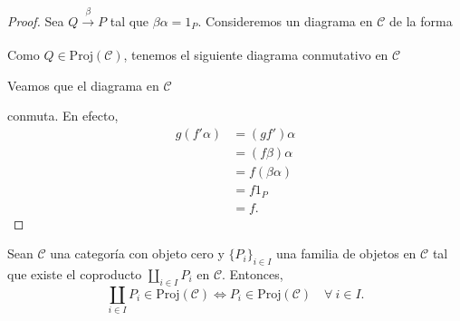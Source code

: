 \documentclass[tesis]{subfiles}
\begin{document}
\begin{proof}

    Sea $Q\xrightarrow[]{\beta} P$ tal que $\beta\alpha=1_P$. Consideremos un diagrama en $\mathscr{C}$ de la forma
    \begin{center}
    \end{center}
    Como $Q\in\text{Proj}(\mathscr{C})$, tenemos el siguiente diagrama conmutativo en $\mathscr{C}$
    \begin{center}
    \end{center}
    Veamos que el diagrama en $\mathscr{C}$
    \begin{center}
    \end{center}
    conmuta. En efecto,
    \begin{align*}
        g(f'\alpha) &= (gf')\alpha \\
                    &= (f\beta)\alpha \\
                    &= f(\beta\alpha) \\
                    &= f1_P \\
                    &= f.
    \end{align*}
\end{proof}

\begin{Prop}\label{Mendoza-1.10.21}
    Sean $\mathscr{C}$ una categoría con objeto cero y $\{P_i\}_{i\in I}$ una familia de objetos en $\mathscr{C}$ tal que existe el coproducto $\coprod_{i\in I}P_i$ en $\mathscr{C}$. Entonces,
    \[
    \coprod_{i\in I}P_i\in \text{Proj}(\mathscr{C}) \iff P_i\in \text{Proj}(\mathscr{C}) \quad \forall \ i\in I.
    \] 
\end{Prop}
\end{document}
